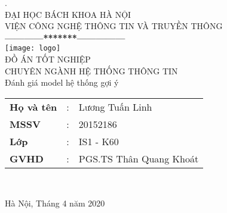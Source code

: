 \thispagestyle{empty}

\thisfancypage{
  \setlength{\fboxrule}{1pt}
  \doublebox}{}
\begin{center}

{
. \\
{\fontsize{12}{12}\selectfont ĐẠI HỌC BÁCH KHOA HÀ NỘI\\VIỆN CÔNG NGHỆ THÔNG TIN VÀ TRUYỀN THÔNG}\\
\textbf{------------*******---------------}\\[1cm]
\texttt{[image: logo]}
\centering
\\[1cm]
{\fontsize{25}{43}\selectfont ĐỒ ÁN TỐT NGHIỆP}\\[0.1cm]
{\fontsize{17}{10}\selectfont CHUYÊN NGÀNH HỆ THỐNG THÔNG TIN}\\[0.9cm]
{\fontsize{20}{26}\selectfont Đánh giá model hệ thống gợi ý}\\[2cm]

\begin{tabular}{l c l}
  \textbf{Họ và tên} & : & Lương Tuấn Linh \\ 
  \textbf{MSSV} & : & 20152186  \\ 
  \textbf{Lớp} & : & IS1 - K60  \\
  \textbf{GVHD} & : &  PGS.TS Thân Quang Khoát  \\
\end{tabular} \\[1.5cm]
}

\fontsize{17}{19}\selectfont Hà Nội, Tháng 4 năm 2020
\end{center}
\pagebreak